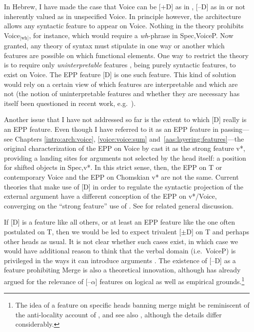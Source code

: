 In Hebrew, I have made the case that Voice can be [\!+\!D] as in {\vd}, [--D] as in {\vz} or not inherently valued as in unspecified Voice. In principle however, the architecture allows any syntactic feature to appear on Voice. Nothing in the theory prohibits Voice$_{\text{[wh]}}$, for instance, which would require a \emph{wh}-phrase in Spec,VoiceP. Now granted, any theory of syntax must stipulate in one way or another which features are possible on which functional elements. One way to restrict the theory is to require only \emph{uninterpretable} features \citep{chomsky95}, being purely syntactic features, to exist on Voice. The EPP feature [D] is one such feature. This kind of solution would rely on a certain view of which features are interpretable and which are not (the notion of uninterpretable features and whether they are necessary has itself been questioned in recent work, e.g.~\citealt{preminger14mit}).

\label{r1:g:2a2}Another issue that I have not addressed so far is the extent to which [D] really is an EPP feature. Even though I have referred to it as an EPP feature in passing---see Chapters \ref{intro:arch:voice}, \ref{voice:voice:sum} and~\ref{aas:layering:features}---the original characterization of the EPP on Voice by \cite{chomsky00,chomsky01} cast it as the strong feature v*, providing a landing sites for arguments not selected by the head itself: a position for shifted objects in Spec,v*. In this strict sense, then, the EPP on T or contemporary Voice and the EPP on Chomskian v* are not the same. Current theories that make use of [D] in order to regulate the syntactic projection of the external argument have a different conception of the EPP on v*/Voice, converging on the ``strong feature'' use of \cite{adger03}. See \cite{adgersvenonius11} for related general discussion.

\label{r1:g:2c1}If [D] is a feature like all others, or at least an EPP feature like the one often postulated on T, then we would be led to expect trivalent [$\pm$D] on T and perhaps other heads as usual. It is not clear whether such cases exist, in which case we would have additional reason to think that the verbal domain (i.e.~VoiceP) is privileged in the ways it can introduce arguments \citep{grimshaw00,woodmarantz17}. The existence of [--D] as a feature prohibiting Merge is also a theoretical innovation, although \cite{harbour11,harbour14} has already argued for the relevance of [--$\alpha$] features on logical as well as empirical grounds.\footnote{The idea of a feature on specific heads banning merge might be reminiscent of the anti-locality account of \cite{grohmann03}, and see also \cite{baier18phd}, although the details differ considerably.}

